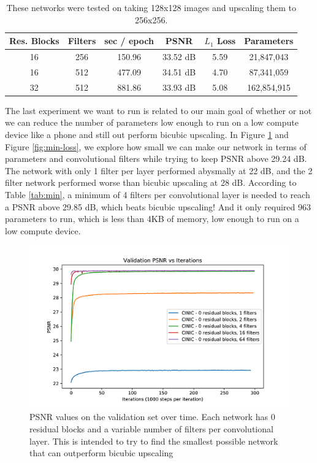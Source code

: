 \documentclass[conference]{IEEEtran}
\begin{document}
\begin{table}[htbp]
  \centering
  \caption{These networks were tested on taking 128x128 images and upscaling them to 256x256.}
  \label{tab:filt}
  \begin{tabular}{c|c|c|c|c|c}
    Res. Blocks & Filters & sec / epoch & PSNR     & $L_1$ Loss & Parameters  \\ \hline
    16          & 256     & 150.96      & 33.52 dB & 5.59       & 21,847,043  \\
    16          & 512     & 477.09      & 34.51 dB & 4.70       & 87,341,059  \\
    32          & 512     & 881.86      & 33.93 dB & 5.08       & 162,854,915 \\
  \end{tabular}
\end{table}

The last experiment we want to run is related to our main goal of whether or not we can reduce the number of parameters low enough to run on a low compute device like a phone and still out perform bicubic upscaling.
In Figure \ref{fig:min-psnr} and Figure \ref{fig:min-loss}, we explore how small we can make our network in terms of parameters and convolutional filters while trying to keep PSNR above 29.24 dB.
The network with only 1 filter per layer performed abysmally at 22 dB, and the 2 filter network performed worse than bicubic upscaling at 28 dB.
According to Table \ref{tab:min}, a minimum of 4 filters per convolutional layer is needed to reach a PSNR above 29.85 dB, which beats bicubic upscaling!
And it only required 963 parameters to run, which is less than 4KB of memory, low enough to run on a low compute device.

\begin{figure}[htbp]
  \centerline{\includegraphics{min-psnr.png}}
  \caption{PSNR values on the validation set over time. Each network has 0 residual blocks and a variable number of filters per convolutional layer. This is intended to try to find the smallest possible network that can outperform bicubic upscaling}
  \label{fig:min-psnr}
\end{figure}
\end{document}
